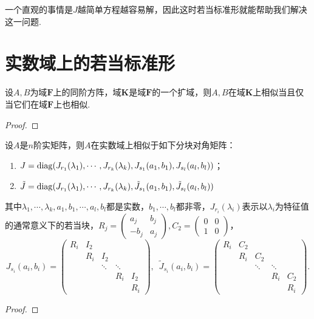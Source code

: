 一个直观的事情是$J$越简单方程越容易解，因此这时若当标准形就能帮助我们解决这一问题.

\section{实数域上的若当标准形} \label{sec:18:实数域上的若当标准形}

\begin{theorem} \label{thm:17:相似域不变性}
    设$A,B$为域$\mathbf{F}$上的同阶方阵，域$\mathbf{K}$是域$\mathbf{F}$的一个扩域，则$A,B$在域$\mathbf{K}$上相似当且仅当它们在域$\mathbf{F}$上也相似.
\end{theorem}
\begin{proof}

\end{proof}

\begin{theorem} \label{thm:17:实数域上的若当标准形}
    设$A$是$n$阶实矩阵，则$A$在实数域上相似于如下分块对角矩阵：
    \begin{enumerate}
        \item $J=\operatorname{diag}(J_{r_1}(\lambda_1),\cdots,J_{r_k}(\lambda_k),J_{s_1}(a_1,b_1),J_{s_l}(a_l,b_l))$；
        \item $\tilde{J}=\operatorname{diag}(J_{r_1}(\lambda_1),\cdots,J_{r_k}(\lambda_k),\tilde{J}_{s_1}(a_1,b_1),\tilde{J}_{s_l}(a_l,b_l))$
    \end{enumerate}
    其中$\lambda_1,\cdots,\lambda_k,a_1,b_1,\cdots,a_l,b_l$都是实数，$b_1,\cdots,b_l$都非零，$J_{r_i}(\lambda_i)$表示以$\lambda_i$为特征值的通常意义下的若当块，$R_j=\begin{pmatrix}
        a_j & b_j \\ -b_j & a_j
    \end{pmatrix},C_2=\begin{pmatrix}
        0 & 0 \\ 1 & 0
    \end{pmatrix}$，
    \[J_{s_i}(a_i,b_i)=\begin{pmatrix}
        R_i & I_2 & & & \\
        & R_i & I_2 & & \\
        & & \ddots & \ddots & \\
        & & & R_i & I_2 \\
        & & & & R_i
    \end{pmatrix},\enspace \tilde{J}_{s_i}(a_i,b_i)=\begin{pmatrix}
        R_i & C_2 & & & \\
        & R_i & C_2 & & \\
        & & \ddots & \ddots & \\
        & & & R_i & C_2 \\
        & & & & R_i
    \end{pmatrix}.\]
\end{theorem}
\begin{proof}

\end{proof}


